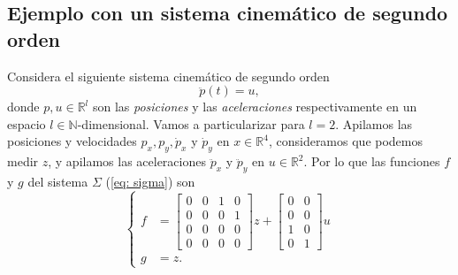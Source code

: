 \subsection{Ejemplo con un sistema cinemático de segundo orden}
Considera el siguiente sistema cinemático de segundo orden
\begin{equation}
	\ddot p(t) = u,
	\label{eq: pdyn}
\end{equation}
donde $p,u\in\mathbb{R}^l$ son las \emph{posiciones} y las \emph{aceleraciones} respectivamente en un espacio $l\in\mathbb{N}$-dimensional. Vamos a particularizar para $l=2$. Apilamos las posiciones y velocidades $p_x,p_y,\dot p_x$ y $\dot p_y$ en $x\in\mathbb{R}^4$, consideramos que podemos medir $z$, y apilamos las aceleraciones $\ddot p_x$ y $\ddot p_y$ en $u\in\mathbb{R}^2$. Por lo que las funciones $f$ y $g$ del sistema $\Sigma$ (\ref{eq: sigma}) son
\begin{equation}
	\begin{cases}
		f &= \begin{bmatrix}0 & 0 & 1 & 0 \\ 0 & 0 & 0 & 1 \\
		0 & 0 & 0 & 0 \\ 0 & 0 & 0 & 0 \end{bmatrix} z + \begin{bmatrix}0 & 0  \\ 0 & 0  \\ 1 & 0 \\ 0 & 1\end{bmatrix} u \\
			g &= z.
\end{cases}
\end{equation}

